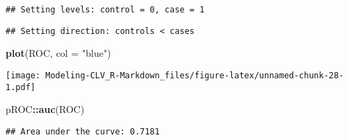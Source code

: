 \documentclass[
]{article}
\newenvironment{Shaded}{\begin{snugshade}}{\end{snugshade}}
\newcommand{\DataTypeTok}[1]{\textcolor[rgb]{0.13,0.29,0.53}{#1}}
\newcommand{\KeywordTok}[1]{\textcolor[rgb]{0.13,0.29,0.53}{\textbf{#1}}}
\newcommand{\NormalTok}[1]{#1}
\newcommand{\OperatorTok}[1]{\textcolor[rgb]{0.81,0.36,0.00}{\textbf{#1}}}
\newcommand{\StringTok}[1]{\textcolor[rgb]{0.31,0.60,0.02}{#1}}
\begin{document}
\begin{verbatim}
## Setting levels: control = 0, case = 1
\end{verbatim}

\begin{verbatim}
## Setting direction: controls < cases
\end{verbatim}

\begin{Shaded}
\begin{Highlighting}[]
\KeywordTok{plot}\NormalTok{(ROC, }\DataTypeTok{col =} \StringTok{"blue"}\NormalTok{)}
\end{Highlighting}
\end{Shaded}

\texttt{[image: Modeling-CLV\_R-Markdown\_files/figure-latex/unnamed-chunk-28-1.pdf]}

\begin{Shaded}
\begin{Highlighting}[]
\NormalTok{pROC}\OperatorTok{::}\KeywordTok{auc}\NormalTok{(ROC)}
\end{Highlighting}
\end{Shaded}

\begin{verbatim}
## Area under the curve: 0.7181
\end{verbatim}
\end{document}
